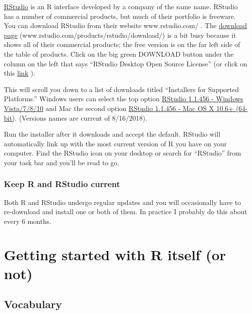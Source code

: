 \documentclass[
]{book}
\begin{document}
\href{www.rstudio.com/}{RStudio} is an R interface developed by a company of the same name. RStudio has a number of commercial products, but much of their portfolio is freeware. You can download RStudio from their website www.rstudio.com/ . The \href{https://www.rstudio.com/products/rstudio/download/}{download page} (www.rstudio.com/products/rstudio/download/) is a bit busy because it shows all of their commercial products; the free version is on the far left side of the table of products. Click on the big green DOWNLOAD button under the column on the left that says ``RStudio Desktop Open Source License'' (or click on this \href{https://www.rstudio.com/products/rstudio/download/\#download}{link} ).

This will scroll you down to a list of downloads titled ``Installers for Supported Platforms.'' Windows users can select the top option \href{https://download1.rstudio.org/RStudio-1.1.456.exe}{RStudio 1.1.456 - Windows Vista/7/8/10} and Mac the second option \href{https://download1.rstudio.org/RStudio-1.1.456.dmg}{RStudio 1.1.456 - Mac OS X 10.6+ (64-bit)}. (Versions names are current of 8/16/2018).

Run the installer after it downloads and accept the default. RStudio will automatically link up with the most current version of R you have on your computer. Find the RStudio icon on your desktop or search for ``RStudio'' from your task bar and you'll be read to go.

\hypertarget{keep-r-and-rstudio-current}{%
\subsection{Keep R and RStudio current}\label{keep-r-and-rstudio-current}}

Both R and RStudio undergo regular updates and you will occasionally have to re-download and install one or both of them. In practice I probably do this about every 6 months.

\hypertarget{getting-started-with-r-itself-or-not}{%
\chapter*{Getting started with R itself (or not)}\label{getting-started-with-r-itself-or-not}}

\hypertarget{vocabulary-2}{%
\section*{Vocabulary}\label{vocabulary-2}}
\end{document}
